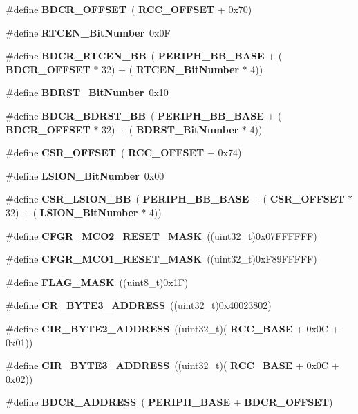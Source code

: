\begin{DoxyCompactItemize}
\item 
\#define \textbf{ B\+D\+C\+R\+\_\+\+O\+F\+F\+S\+ET}~(\textbf{ R\+C\+C\+\_\+\+O\+F\+F\+S\+ET} + 0x70)
\item 
\#define \textbf{ R\+T\+C\+E\+N\+\_\+\+Bit\+Number}~0x0F
\item 
\#define \textbf{ B\+D\+C\+R\+\_\+\+R\+T\+C\+E\+N\+\_\+\+BB}~(\textbf{ P\+E\+R\+I\+P\+H\+\_\+\+B\+B\+\_\+\+B\+A\+SE} + (\textbf{ B\+D\+C\+R\+\_\+\+O\+F\+F\+S\+ET} $\ast$ 32) + (\textbf{ R\+T\+C\+E\+N\+\_\+\+Bit\+Number} $\ast$ 4))
\item 
\#define \textbf{ B\+D\+R\+S\+T\+\_\+\+Bit\+Number}~0x10
\item 
\#define \textbf{ B\+D\+C\+R\+\_\+\+B\+D\+R\+S\+T\+\_\+\+BB}~(\textbf{ P\+E\+R\+I\+P\+H\+\_\+\+B\+B\+\_\+\+B\+A\+SE} + (\textbf{ B\+D\+C\+R\+\_\+\+O\+F\+F\+S\+ET} $\ast$ 32) + (\textbf{ B\+D\+R\+S\+T\+\_\+\+Bit\+Number} $\ast$ 4))
\item 
\#define \textbf{ C\+S\+R\+\_\+\+O\+F\+F\+S\+ET}~(\textbf{ R\+C\+C\+\_\+\+O\+F\+F\+S\+ET} + 0x74)
\item 
\#define \textbf{ L\+S\+I\+O\+N\+\_\+\+Bit\+Number}~0x00
\item 
\#define \textbf{ C\+S\+R\+\_\+\+L\+S\+I\+O\+N\+\_\+\+BB}~(\textbf{ P\+E\+R\+I\+P\+H\+\_\+\+B\+B\+\_\+\+B\+A\+SE} + (\textbf{ C\+S\+R\+\_\+\+O\+F\+F\+S\+ET} $\ast$ 32) + (\textbf{ L\+S\+I\+O\+N\+\_\+\+Bit\+Number} $\ast$ 4))
\item 
\#define \textbf{ C\+F\+G\+R\+\_\+\+M\+C\+O2\+\_\+\+R\+E\+S\+E\+T\+\_\+\+M\+A\+SK}~((uint32\+\_\+t)0x07\+F\+F\+F\+F\+F\+F)
\item 
\#define \textbf{ C\+F\+G\+R\+\_\+\+M\+C\+O1\+\_\+\+R\+E\+S\+E\+T\+\_\+\+M\+A\+SK}~((uint32\+\_\+t)0x\+F89\+F\+F\+F\+F\+F)
\item 
\#define \textbf{ F\+L\+A\+G\+\_\+\+M\+A\+SK}~((uint8\+\_\+t)0x1\+F)
\item 
\#define \textbf{ C\+R\+\_\+\+B\+Y\+T\+E3\+\_\+\+A\+D\+D\+R\+E\+SS}~((uint32\+\_\+t)0x40023802)
\item 
\#define \textbf{ C\+I\+R\+\_\+\+B\+Y\+T\+E2\+\_\+\+A\+D\+D\+R\+E\+SS}~((uint32\+\_\+t)(\textbf{ R\+C\+C\+\_\+\+B\+A\+SE} + 0x0\+C + 0x01))
\item 
\#define \textbf{ C\+I\+R\+\_\+\+B\+Y\+T\+E3\+\_\+\+A\+D\+D\+R\+E\+SS}~((uint32\+\_\+t)(\textbf{ R\+C\+C\+\_\+\+B\+A\+SE} + 0x0\+C + 0x02))
\item 
\#define \textbf{ B\+D\+C\+R\+\_\+\+A\+D\+D\+R\+E\+SS}~(\textbf{ P\+E\+R\+I\+P\+H\+\_\+\+B\+A\+SE} + \textbf{ B\+D\+C\+R\+\_\+\+O\+F\+F\+S\+ET})
\end{DoxyCompactItemize}

